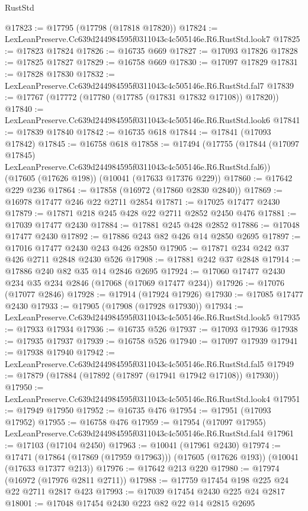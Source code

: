 \begin{lexlean}{RustStd}
\begin{coremodule}
@17823 := @17795 (@17798 (@17818 @17820))
@17824 := LexLeanPreserve.Cc639d244984595f0311043c4c505146e.R6.RustStd.look7
@17825 := @17823 @17824
@17826 := @16735 @669
@17827 := @17093 @17826
@17828 := @17825 @17827
@17829 := @16758 @669
@17830 := @17097 @17829
@17831 := @17828 @17830
@17832 := LexLeanPreserve.Cc639d244984595f0311043c4c505146e.R6.RustStd.fal7
@17839 := @17767 (@17772 (@17780 (@17785 (@17831 @17832 @17108)) @17820))
@17840 := LexLeanPreserve.Cc639d244984595f0311043c4c505146e.R6.RustStd.look6
@17841 := @17839 @17840
@17842 := @16735 @618
@17844 := @17841 (@17093 @17842)
@17845 := @16758 @618
@17858 := @17494
    (@17755
      (@17844 (@17097 @17845) LexLeanPreserve.Cc639d244984595f0311043c4c505146e.R6.RustStd.fal6))
    (@17605 (@17626 @198))
    (@10041 (@17633 @17376 @229))
@17860 := @17642 @229 @236
@17864 := @17858 (@16972 (@17860 @2830 @2840))
@17869 := @16978 @17477 @246 @22 @2711 @2854
@17871 := @17025 @17477 @2430
@17879 := @17871 @218 @245 @428 @22 @2711 @2852 @2450 @476
@17881 := @17039 @17477 @2430
@17884 := @17881 @245 @428 @2852
@17886 := @17048 @17477 @2430
@17892 := @17886 @243 @82 @426 @14 @2850 @2695
@17897 := @17016 @17477 @2430 @243 @426 @2850
@17905 := @17871 @234 @242 @37 @426 @2711 @2848 @2430 @526
@17908 := @17881 @242 @37 @2848
@17914 := @17886 @240 @82 @35 @14 @2846 @2695
@17924 := @17060 @17477 @2430 @234 @35 @234 @2846 (@17068 (@17069 @17477 @234))
@17926 := @17076 (@17077 @2846)
@17928 := @17914 (@17924 @17926)
@17930 := @17085 @17477 @2430
@17933 := @17905 (@17908 (@17928 @17930))
@17934 := LexLeanPreserve.Cc639d244984595f0311043c4c505146e.R6.RustStd.look5
@17935 := @17933 @17934
@17936 := @16735 @526
@17937 := @17093 @17936
@17938 := @17935 @17937
@17939 := @16758 @526
@17940 := @17097 @17939
@17941 := @17938 @17940
@17942 := LexLeanPreserve.Cc639d244984595f0311043c4c505146e.R6.RustStd.fal5
@17949 := @17879 (@17884 (@17892 (@17897 (@17941 @17942 @17108)) @17930))
@17950 := LexLeanPreserve.Cc639d244984595f0311043c4c505146e.R6.RustStd.look4
@17951 := @17949 @17950
@17952 := @16735 @476
@17954 := @17951 (@17093 @17952)
@17955 := @16758 @476
@17959 := @17954 (@17097 @17955) LexLeanPreserve.Cc639d244984595f0311043c4c505146e.R6.RustStd.fal4
@17961 := @17103 (@17104 @2450)
@17963 := @10041 (@17961 @2430)
@17974 := @17471
    (@17864 (@17869 (@17959 @17963)))
    (@17605 (@17626 @193))
    (@10041 (@17633 @17377 @213))
@17976 := @17642 @213 @220
@17980 := @17974 (@16972 (@17976 @2811 @2711))
@17988 := @17759 @17454 @198 @225 @24 @22 @2711 @2817 @423
@17993 := @17039 @17454 @2430 @225 @24 @2817
@18001 := @17048 @17454 @2430 @223 @82 @22 @14 @2815 @2695

\end{coremodule}
\end{lexlean}
